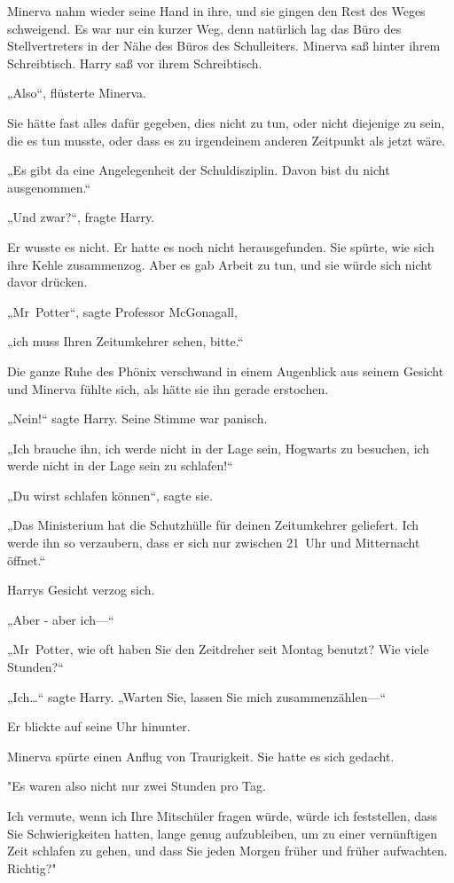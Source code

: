 {Minerva nahm wieder seine Hand in ihre, und sie gingen den Rest des Weges schweigend. Es war nur ein kurzer Weg, denn natürlich lag das Büro des Stellvertreters in der Nähe des Büros des Schulleiters. Minerva saß hinter ihrem Schreibtisch. Harry saß vor ihrem Schreibtisch.

„Also“, flüsterte Minerva.

Sie hätte fast alles dafür gegeben, dies nicht zu tun, oder nicht diejenige zu sein, die es tun musste, oder dass es zu irgendeinem anderen Zeitpunkt als jetzt wäre.

„Es gibt da eine Angelegenheit der Schuldisziplin. Davon bist du nicht ausgenommen.“

„Und zwar?“, fragte Harry.

Er wusste es nicht. Er hatte es noch nicht herausgefunden. Sie spürte, wie sich ihre Kehle zusammenzog. Aber es gab Arbeit zu tun, und sie würde sich nicht davor drücken.

„Mr~Potter“, sagte Professor McGonagall,

„ich muss Ihren Zeitumkehrer sehen, bitte.“

Die ganze Ruhe des Phönix verschwand in einem Augenblick aus seinem Gesicht und Minerva fühlte sich, als hätte sie ihn gerade erstochen.

„Nein!“ sagte Harry. Seine Stimme war panisch.

„Ich brauche ihn, ich werde nicht in der Lage sein, Hogwarts zu besuchen, ich werde nicht in der Lage sein zu schlafen!“

„Du wirst schlafen können“, sagte sie.

„Das Ministerium hat die Schutzhülle für deinen Zeitumkehrer geliefert. Ich werde ihn so verzaubern, dass er sich nur zwischen 21~Uhr und Mitternacht öffnet.“

Harrys Gesicht verzog sich.

„Aber - aber ich—“

„Mr~Potter, wie oft haben Sie den Zeitdreher seit Montag benutzt? Wie viele Stunden?“

„Ich…“ sagte Harry. „Warten Sie, lassen Sie mich zusammenzählen—“

Er blickte auf seine Uhr hinunter.

Minerva spürte einen Anflug von Traurigkeit. Sie hatte es sich gedacht.

"Es waren also nicht nur zwei Stunden pro Tag.

Ich vermute, wenn ich Ihre Mitschüler fragen würde, würde ich feststellen, dass Sie Schwierigkeiten hatten, lange genug aufzubleiben, um zu einer vernünftigen Zeit schlafen zu gehen, und dass Sie jeden Morgen früher und früher aufwachten. Richtig?"

}
